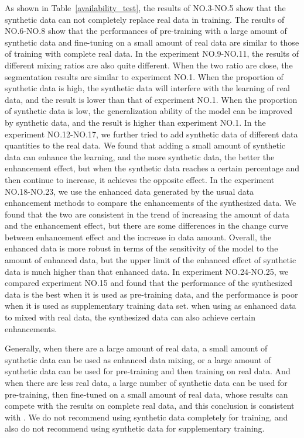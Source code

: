 \documentclass[letterpaper]{article} %
\begin{document}
As shown in Table~\ref{availability_test}, the results of NO.3-NO.5 show that the synthetic data can not completely replace real data in training.            
The results of NO.6-NO.8 show that the performances of pre-training with a large amount of synthetic data and fine-tuning on a small amount of real data are similar to those of training with complete real data.   
In the experiment NO.9-NO.11, the results of different mixing ratios are also quite different. When the two ratio are close, the segmentation results are similar to experiment NO.1. When the proportion of synthetic data is high, the synthetic data will interfere with the learning of real data, and the result is lower than that of experiment NO.1. When the proportion of synthetic data is low, the generalization ability of the model can be improved by synthetic data, and the result is higher than experiment NO.1.            
In the experiment NO.12-NO.17, we further tried to add synthetic data of different data quantities to the real data. We found that adding a small amount of synthetic data can enhance the learning, and the more synthetic data, the better the enhancement effect, but when the synthetic data reaches a certain percentage and then continue to increase, it achieves the opposite effect.  
In the experiment NO.18-NO.23, we use the enhanced data generated by the usual data enhancement methods to compare the enhancements of the synthesized data. We found that the two are consistent in the trend of increasing the amount of data and the enhancement effect, but there are some differences in  the change curve between  enhancement effect and the increase in data amount. Overall, the enhanced data is more robust in terms of the sensitivity of the model to the amount of enhanced data, but the upper limit of the enhanced effect of synthetic data is much higher than that enhanced data.   
In experiment NO.24-NO.25, we compared experiment NO.15 and found that the performance of the synthesized data is the best when it is used as pre-training data, and the performance is poor when it is used as supplementary training data set. when using as enhanced data to mixed with real data, the synthesized data can also achieve certain enhancements.

Generally, when there are a large amount of real data, a small amount of synthetic data can be used as enhanced data mixing, or a large amount of synthetic data can be used for pre-training and then training on real data. And when there are less real data, a large number of synthetic data can be used for pre-training, then fine-tuned on a small amount of real data, whose results can compete with the results on complete real data, and this conclusion is consistent with \cite{4shin2018medical}. We do not recommend using synthetic data completely for training, and also do not recommend using synthetic data for supplementary training.
\end{document}
